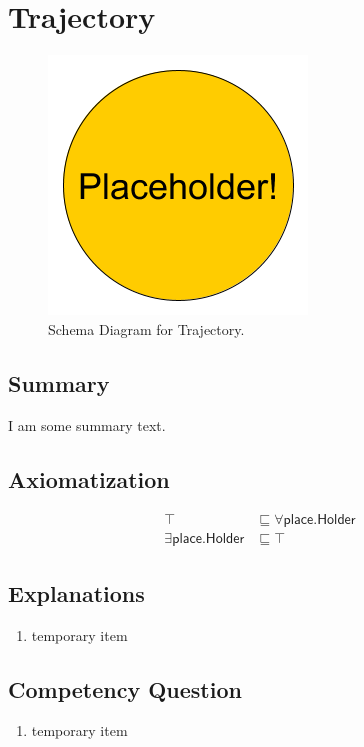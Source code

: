 \section{Trajectory}
\label{sec:Trajectory}
\begin{figure}[h!]
\begin{center}
\includegraphics[width=.4\textwidth]{figures/placeholder}
\end{center}
\caption{Schema Diagram for Trajectory.}
\label{fig:Trajectory}
\end{figure}
\subsection{Summary}
\label{sum:Trajectory}
I am some summary text.

\subsection{Axiomatization}
\label{axs:Trajectory}
\begin{align}
\top &\sqsubseteq \forall\textsf{place.Holder} \\ 
\exists\textsf{place.Holder} &\sqsubseteq \top 
\end{align}

\subsection{Explanations}
\label{exp:Trajectory}
\begin{enumerate}
\item temporary item
\end{enumerate}

\subsection{Competency Question}
\label{cqs:Trajectory}
\begin{enumerate}[CQ1.]
\item temporary item
\end{enumerate}

